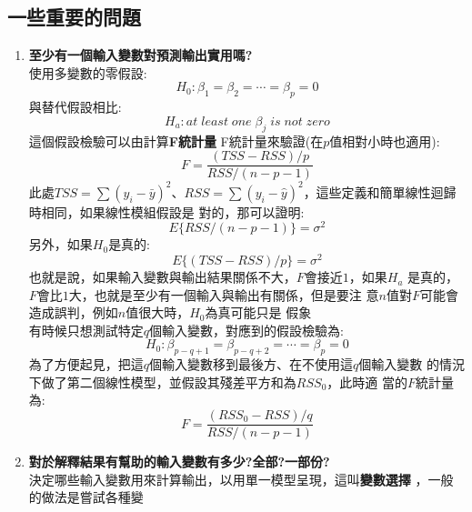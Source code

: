 \documentclass{report} %
\begin{document}
    \subsection{一些重要的問題}
      \begin{enumerate}
        \item {\bf 至少有一個輸入變數對預測輸出實用嗎?}\\
          使用多變數的零假設:
          \[
            H_0:\beta_1 = \beta_2 = \cdots = \beta_p = 0
          \]
          與替代假設相比:
          \[
            H_a : at\;least\;one\;\beta_j\;is\;not\;zero
          \]
          這個假設檢驗可以由計算{\bf F統計量}\marginpar
            {F統計量}來驗證(在$p$值相對小時也適用):
          \begin{equation}
            F = \frac{(TSS - RSS) / p}{RSS / (n - p - 1)}
          \end{equation}
          此處$TSS = \sum(y_i - \bar{y}) ^ 2$、$RSS = \sum(y_i -
            \hat{y}) ^ 2$，這些定義和簡單線性迴歸時相同，如果線性模組假設是
            對的，那可以證明:
          \begin{equation}
            E\{RSS / (n - p - 1)\} = \sigma ^ 2
          \end{equation}
          另外，如果$H_0$是真的:
          \begin{equation}
            E\{(TSS - RSS) / p\} = \sigma ^ 2
          \end{equation}
          也就是說，如果輸入變數與輸出結果關係不大，$F$會接近$1$，如果$H_a$
            是真的，$F$會比$1$大，也就是至少有一個輸入與輸出有關係，但是要注
            意$n$值對$F$可能會造成誤判，例如$n$值很大時，$H_0$為真可能只是
            假象\\
          有時候只想測試特定$q$個輸入變數，對應到的假設檢驗為:
          \[
            H_0:\beta_{p - q + 1} = \beta_{p - q + 2} = \cdots =
              \beta_p = 0
          \]
          為了方便起見，把這$q$個輸入變數移到最後方、在不使用這$q$個輸入變數
            的情況下做了第二個線性模型，並假設其殘差平方和為$RSS_0$，此時適
            當的$F$統計量為:
          \begin{equation}
            F = \frac{(RSS_0 - RSS) / q}{RSS / (n - p - 1)}
          \end{equation}
        \item {\bf 對於解釋結果有幫助的輸入變數有多少?全部?一部份?} \\
          決定哪些輸入變數用來計算輸出，以用單一模型呈現，這叫{\bf 變數選擇}
            ，一般的做法是嘗試各種變

\end{enumerate}
\end{document}
